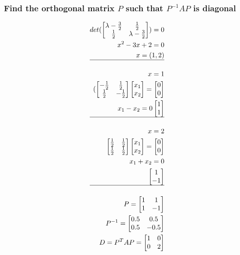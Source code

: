 \documentclass[12pt, a4paper]{article}
\begin{document}
			\subsubsection{Find the orthogonal matrix $P$ such that $P^{-1}AP$ is diagonal}
				\begin{align*}
					det(\begin{bmatrix}\lambda-\frac{3}{2} & \frac{1}{2}\\\frac{1}{2}&\lambda-\frac{3}{2}\end{bmatrix})=0\\
					x^2-3x+2=0\\
					x=(1,2)\\
					\hline\\
					x=1\\
					(\begin{bmatrix}-\frac{1}{2} & \frac{1}{2}\\\frac{1}{2}&-\frac{1}{2}\end{bmatrix}\begin{bmatrix}x_1\\x_2\end{bmatrix}=\begin{bmatrix}0\\0\end{bmatrix}\\
					x_1-x_2=0
					\begin{bmatrix}1\\1\end{bmatrix}\\
					\hline\\
					x=2\\
					\begin{bmatrix}\frac{1}{2} & \frac{1}{2}\\\frac{1}{2}&\frac{1}{2}\end{bmatrix}\begin{bmatrix}x_1\\x_2\end{bmatrix}=\begin{bmatrix}0\\0\end{bmatrix}\\
					x_1+x_2=0\\
					\begin{bmatrix}1\\-1\end{bmatrix}\\
					\hline\\
					P=\begin{bmatrix}1&1\\1&-1\end{bmatrix}\\
					P^{-1}=\begin{bmatrix}0.5&0.5\\0.5&-0.5\end{bmatrix}\\
					D=P^TAP=\begin{bmatrix}1&0\\0&2\end{bmatrix}
				\end{align*}
\end{document}
